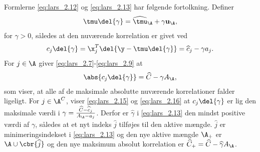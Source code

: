 %
Formlerne \eqref{eq:lars_2.12} og \eqref{eq:lars_2.13} har følgende fortolkning.
Definer
\begin{align}
\tmu \del{\gamma} = \widehat{\tmu}_\A + \gamma \mathbf{u}_\A, \label{eq:lars_2.14}
\end{align}
for \(\gamma > 0\), således at den nuværende korrelation er givet ved
\begin{align}
c_j \del{\gamma} = \x_j^T \del{\y - \tmu \del{\gamma}} = \widehat{c}_j - \gamma a_j. \label{eq:lars_2.15}
\end{align}
For \(j \in \A\) giver \eqref{eq:lars_2.7}-\eqref{eq:lars_2.9} at
\begin{align}
\abs{c_j \del{\gamma}} = \widehat{C} - \gamma A_\A,\label{eq:lars_2.16}
\end{align}
som viser, at alle af de maksimale absolutte nuværende korrelationer falder ligeligt.
For \(j \in \A^C\), viser \eqref{eq:lars_2.15} og \eqref{eq:lars_2.16} at \(c_j \del{\gamma}\) er lig den maksimale værdi i \(\gamma = \frac{\widehat{C} - \widehat{c}_j}{A_\A - a_j}\).
Derfor er \(\widehat{\gamma}\) i \eqref{eq:lars_2.13} den mindst positive værdi af \(\gamma\), således at et nyt indeks \(\widehat{j}\) tilføjes til den aktive mængde.
\(\widehat{j}\) er minimeringsindekset i \eqref{eq:lars_2.13} og den nye aktive mængde \(\A_+\) er \(\A \cup \cbr{\widehat{j}}\) og den nye maksimum absolut korrelation er \(\widehat{C}_+ = \widehat{C}- \widehat{\gamma} A_\A\).
%
%

